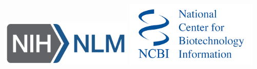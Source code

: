 \documentclass[landscape]{slides}
\begin{document}
\begin{slide}
\begin{center}
\includegraphics[width=2.5in]{figs/NIH_NLM_ABRV_2C_4-white}
\includegraphics[width=2.5in]{figs/ncbi-logo}

\end{center}

\vfill
\end{slide}
\end{document}
